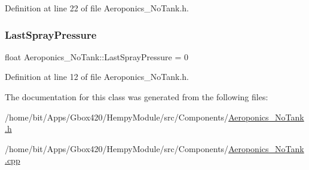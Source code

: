 Definition at line 22 of file Aeroponics\+\_\+\+No\+Tank.\+h.

\mbox{\label{class_aeroponics___no_tank_aeb5716169a0496dd832626aa67160da9}} 
\subsubsection{\texorpdfstring{Last\+Spray\+Pressure}{LastSprayPressure}}
{\footnotesize\ttfamily float Aeroponics\+\_\+\+No\+Tank\+::\+Last\+Spray\+Pressure = 0}



Definition at line 12 of file Aeroponics\+\_\+\+No\+Tank.\+h.



The documentation for this class was generated from the following files\+:\begin{DoxyCompactItemize}
\item 
/home/bit/\+Apps/\+Gbox420/\+Hempy\+Module/src/\+Components/\hyperlink{_hempy_module_2src_2_components_2_aeroponics___no_tank_8h}{Aeroponics\+\_\+\+No\+Tank.\+h}\item 
/home/bit/\+Apps/\+Gbox420/\+Hempy\+Module/src/\+Components/\hyperlink{_hempy_module_2src_2_components_2_aeroponics___no_tank_8cpp}{Aeroponics\+\_\+\+No\+Tank.\+cpp}\end{DoxyCompactItemize}
